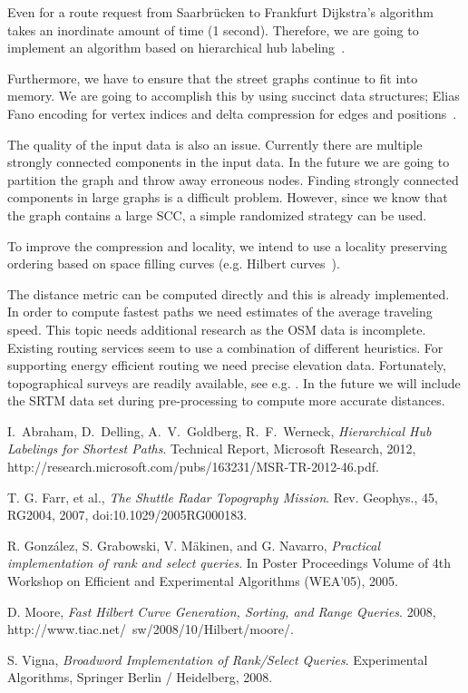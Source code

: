\documentclass[a4paper]{article}
\begin{document}
Even for a route request from Saarbrücken to Frankfurt Dijkstra's algorithm takes an inordinate amount of time (1 second).
Therefore, we are going to implement an algorithm based on hierarchical hub labeling~\cite{abra12}.

Furthermore, we have to ensure that the street graphs continue to fit into memory.
We are going to accomplish this by using succinct data structures;
Elias Fano encoding for vertex indices and delta compression for edges and positions~\cite{gon05, vig08}.

The quality of the input data is also an issue.
Currently there are multiple strongly connected components in the input data.
In the future we are going to partition the graph and throw away erroneous nodes.
Finding strongly connected components in large graphs is a difficult problem.
However, since we know that the graph contains a large SCC,
a simple randomized strategy can be used.

To improve the compression and locality, we intend to use a locality preserving ordering based on space filling curves
(e.g. Hilbert curves~\cite{moo08}).

The distance metric can be computed directly and this is already implemented.
In order to compute fastest paths we need estimates of the average traveling speed.
This topic needs additional research as the OSM data is incomplete. Existing routing
services seem to use a combination of different heuristics.
For supporting energy efficient routing we need precise elevation data.
Fortunately, topographical surveys are readily available, see e.g. \cite{farr07}.
In the future we will include the SRTM data set during pre-processing to compute
more accurate distances.

\begin{thebibliography}{9}

  I.~Abraham, D.~Delling, A.~V.~Goldberg, R.~F.~Werneck,
  \emph{Hierarchical Hub Labelings for Shortest Paths}.
  Technical Report,
  Microsoft Research,
  2012,
  http://research.microsoft.com/pubs/163231/MSR-TR-2012-46.pdf.

	T. G. Farr, et al., \emph{The Shuttle Radar Topography Mission}. Rev. Geophys., 45, RG2004, 2007, doi:10.1029/2005RG000183.
	
	R. González, S. Grabowski, V. Mäkinen, and G. Navarro, \emph{Practical implementation of rank and select queries}. In Poster Proceedings Volume of 4th Workshop on Efficient and Experimental Algorithms (WEA'05), 2005.
	
	D. Moore, \emph{Fast Hilbert Curve Generation, Sorting, and Range Queries}. 2008, http://www.tiac.net/~sw/2008/10/Hilbert/moore/.
	
	S. Vigna, \emph{Broadword Implementation of Rank/Select Queries}. Experimental Algorithms, Springer Berlin / Heidelberg, 2008.

\end{thebibliography}
\end{document}
